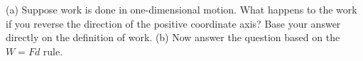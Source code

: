 (a) Suppose work is done in one-dimensional motion. What
happens to the work if you reverse the direction of the
positive coordinate axis? Base your answer directly on the
definition of work. (b) Now answer the question based on
the $W=Fd$ rule.

